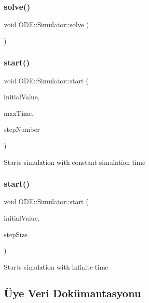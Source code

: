 \subsubsection{\texorpdfstring{solve()}{solve()}}
{\footnotesize\ttfamily void O\+D\+E\+::\+Simulator\+::solve (\begin{DoxyParamCaption}{ }\end{DoxyParamCaption})}

\mbox{\label{classODE_1_1Simulator_a39b9e5d9c43f4fa61ec77f8904bae16c}} 
\subsubsection{\texorpdfstring{start()}{start()}\hspace{0.1cm}{\footnotesize\ttfamily [1/2]}}
{\footnotesize\ttfamily void O\+D\+E\+::\+Simulator\+::start (\begin{DoxyParamCaption}\item[{Eigen\+::\+Vector\+Xd}]{initial\+Value,  }\item[{double}]{max\+Time,  }\item[{int}]{step\+Number }\end{DoxyParamCaption})}

Starts simulation with constant simulation time \mbox{\label{classODE_1_1Simulator_a07006cb053265d3b00dc7228a9eee61f}} 
\subsubsection{\texorpdfstring{start()}{start()}\hspace{0.1cm}{\footnotesize\ttfamily [2/2]}}
{\footnotesize\ttfamily void O\+D\+E\+::\+Simulator\+::start (\begin{DoxyParamCaption}\item[{Eigen\+::\+Vector\+Xd}]{initial\+Value,  }\item[{double}]{step\+Size }\end{DoxyParamCaption})}

Starts simulation with infinite time 

\subsection{Üye Veri Dokümantasyonu}
\mbox{\label{classODE_1_1Simulator_a5be06804c54afe1708b4317777bc39e3}} 
